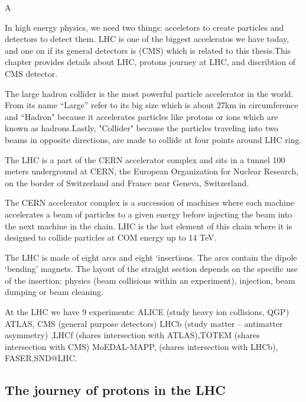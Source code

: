 A

In high	energy physics, we need two things: acceletors to create particles and detectors to detect them. LHC is one of the biggest acceleratos we have today, and one on if its general detectors is (CMS) which is related to this thesis.This chapter provides details about LHC, protons journey at LHC, and discribtion of CMS detector.   


The large hadron collider is the most powerful particle accelerator in the world. From its name “Large” refer to its big size which is about 27km in circumference and “Hadron" because it accelerates particles like protons or ions which are known as hadrons.Lastly, "Collider" because the particles traveling into two beams in opposite directions, are made to collide at four points around LHC ring.

The LHC is a part of the CERN accelerator complex and sits in a tunnel 100 meters underground at CERN, the European Organization for Nuclear Research, on the border of Switzerland and France near Geneva, Switzerland.

The CERN accelerator complex is a succession of machines where each machine accelerates a beam of particles to a given energy before injecting the beam into the next machine in the chain. LHC is the last element of this chain where it is designed to collide particles at COM energy up to 14 TeV.

The LHC is made of eight arcs and eight ‘insertions. The arcs contain the dipole ‘bending’ magnets. The layout of the straight section depends on the specific use of the insertion: physics (beam collisions within an experiment), injection, beam dumping or beam cleaning.

At the LHC we have 9 experiments:
ALICE (study heavy ion collisions, QGP) ATLAS, CMS  (general purpose detectors) LHCb (study matter – antimatter asymmetry) ,LHCf (shares intersection with ATLAS),TOTEM (shares intersection with CMS) MoEDAL-MAPP, (shares intersection with LHCb), FASER,SND@LHC.

\subsection{The journey of protons in the LHC}

